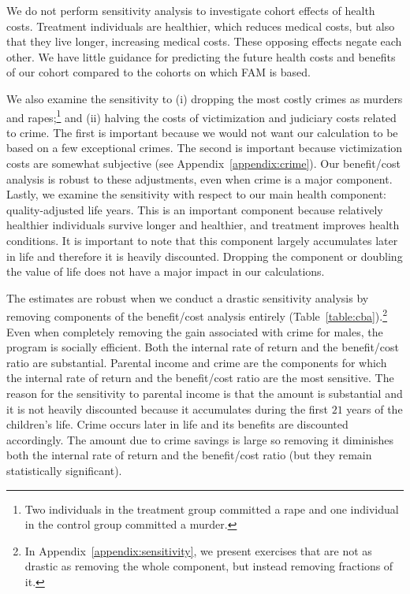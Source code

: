 We do not perform sensitivity analysis to investigate cohort effects of health costs. Treatment individuals are healthier, which reduces medical costs, but also that they live longer, increasing medical costs. These opposing effects negate each other. We have little guidance for predicting the future health costs and benefits of our cohort compared to the cohorts on which FAM is based.

We also examine the sensitivity to (i) dropping the most costly crimes as murders and rapes;\footnote{Two individuals in the treatment group committed a rape and one individual in the control group committed a murder.} and (ii) halving the costs of victimization and judiciary costs related to crime.  The first is important because we would not want our calculation to be based on a few exceptional crimes. The second is important because victimization costs are somewhat subjective (see Appendix~\ref{appendix:crime}). Our benefit/cost analysis is robust to these adjustments, even when crime is a major component. Lastly, we examine the sensitivity with respect to our main health component: quality-adjusted life years. This is an important component because relatively healthier individuals survive longer and healthier, and treatment improves health conditions. It is important to note that this component largely accumulates later in life and therefore it is heavily discounted. Dropping the component or doubling the value of life does not have a major impact in our calculations.

The estimates are robust when we conduct a drastic sensitivity analysis by removing components of the benefit/cost analysis entirely (Table~\ref{table:cba}).\footnote{In Appendix~\ref{appendix:sensitivity}, we present exercises that are not as drastic as removing the whole component, but instead removing fractions of it.} Even when completely removing the gain associated with crime for males, the program is socially efficient. Both the internal rate of return and the benefit/cost ratio are substantial. Parental income and crime are the components for which the internal rate of return and the benefit/cost ratio are the most sensitive. The reason for the sensitivity to parental income is that the amount is substantial and it is not heavily discounted because it accumulates during the first $21$ years of the children's life. Crime occurs later in life and its benefits are discounted accordingly. The amount due to crime savings is large so removing it diminishes both the internal rate of return and the benefit/cost ratio (but they remain statistically significant).

